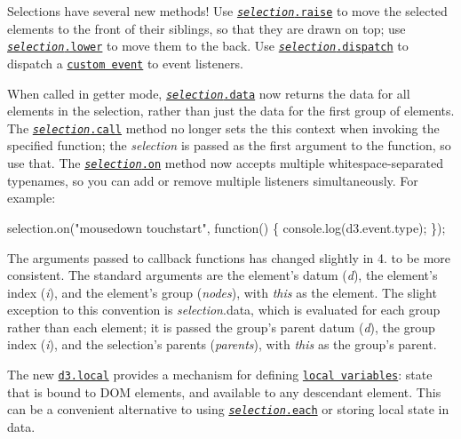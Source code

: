 Selections have several new methods! Use \href{https://github.com/d3/d3-selection/blob/master/README.md#selection_raise}{\tt {\itshape selection}.raise} to move the selected elements to the front of their siblings, so that they are drawn on top; use \href{https://github.com/d3/d3-selection/blob/master/README.md#selection_lower}{\tt {\itshape selection}.lower} to move them to the back. Use \href{https://github.com/d3/d3-selection/blob/master/README.md#selection_dispatch}{\tt {\itshape selection}.dispatch} to dispatch a \href{https://developer.mozilla.org/en-US/docs/Web/API/CustomEvent}{\tt custom event} to event listeners.

When called in getter mode, \href{https://github.com/d3/d3-selection/blob/master/README.md#selection_data}{\tt {\itshape selection}.data} now returns the data for all elements in the selection, rather than just the data for the first group of elements. The \href{https://github.com/d3/d3-selection/blob/master/README.md#selection_call}{\tt {\itshape selection}.call} method no longer sets the {\ttfamily this} context when invoking the specified function; the {\itshape selection} is passed as the first argument to the function, so use that. The \href{https://github.com/d3/d3-selection/blob/master/README.md#selection_on}{\tt {\itshape selection}.on} method now accepts multiple whitespace-\/separated typenames, so you can add or remove multiple listeners simultaneously. For example\+:


\begin{DoxyCode}
selection.on("mousedown touchstart", function() \{
  console.log(d3.event.type);
\});
\end{DoxyCode}


The arguments passed to callback functions has changed slightly in 4. to be more consistent. The standard arguments are the element’s datum ({\itshape d}), the element’s index ({\itshape i}), and the element’s group ({\itshape nodes}), with {\itshape this} as the element. The slight exception to this convention is {\itshape selection}.data, which is evaluated for each group rather than each element; it is passed the group’s parent datum ({\itshape d}), the group index ({\itshape i}), and the selection’s parents ({\itshape parents}), with {\itshape this} as the group’s parent.

The new \href{https://github.com/d3/d3-selection/blob/master/README.md#local-variables}{\tt d3.\+local} provides a mechanism for defining \href{https://bl.ocks.org/mbostock/e1192fe405703d8321a5187350910e08}{\tt local variables}\+: state that is bound to D\+OM elements, and available to any descendant element. This can be a convenient alternative to using \href{https://github.com/d3/d3-selection/blob/master/README.md#selection_each}{\tt {\itshape selection}.each} or storing local state in data.

